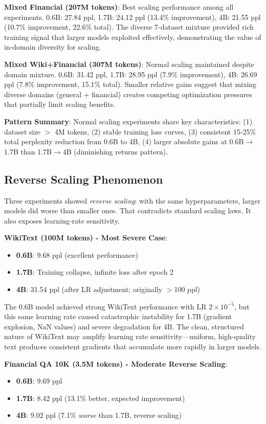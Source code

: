\textbf{Mixed Financial (207M tokens)}: Best scaling performance among all experiments. 0.6B: 27.84 ppl, 1.7B: 24.12 ppl (13.4\% improvement), 4B: 21.55 ppl (10.7\% improvement, 22.6\% total). The diverse 7-dataset mixture provided rich training signal that larger models exploited effectively, demonstrating the value of in-domain diversity for scaling.

\textbf{Mixed Wiki+Financial (307M tokens)}: Normal scaling maintained despite domain mixture. 0.6B: 31.42 ppl, 1.7B: 28.95 ppl (7.9\% improvement), 4B: 26.69 ppl (7.8\% improvement, 15.1\% total). Smaller relative gains suggest that mixing diverse domains (general + financial) creates competing optimization pressures that partially limit scaling benefits.

\textbf{Pattern Summary}: Normal scaling experiments share key characteristics: (1) dataset size $>$ 4M tokens, (2) stable training loss curves, (3) consistent 15-25\% total perplexity reduction from 0.6B to 4B, (4) larger absolute gains at 0.6B$\to$1.7B than 1.7B$\to$4B (diminishing returns pattern).

\subsection{Reverse Scaling Phenomenon}

Three experiments showed \textit{reverse scaling}: with the same hyperparameters, larger models did worse than smaller ones. That contradicts standard scaling laws. It also exposes learning‑rate sensitivity.

\textbf{WikiText (100M tokens) - Most Severe Case}:
\begin{itemize}
\item \textbf{0.6B}: 9.68 ppl (excellent performance)
\item \textbf{1.7B}: Training collapse, infinite loss after epoch 2
\item \textbf{4B}: 31.54 ppl (after LR adjustment; originally $>$100 ppl)
\end{itemize}

The 0.6B model achieved strong WikiText performance with LR $2 \times 10^{-5}$, but this same learning rate caused catastrophic instability for 1.7B (gradient explosion, NaN values) and severe degradation for 4B. The clean, structured nature of WikiText may amplify learning rate sensitivity---uniform, high-quality text produces consistent gradients that accumulate more rapidly in larger models.

\textbf{Financial QA 10K (3.5M tokens) - Moderate Reverse Scaling}:
\begin{itemize}
\item \textbf{0.6B}: 9.69 ppl
\item \textbf{1.7B}: 8.42 ppl (13.1\% better, expected improvement)
\item \textbf{4B}: 9.02 ppl (7.1\% \textit{worse} than 1.7B, reverse scaling)
\end{itemize}

